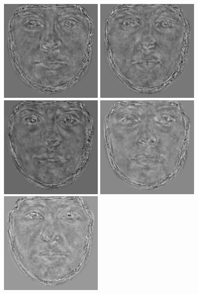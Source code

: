 \documentclass[12pt]{article}
\begin{document}
\begin{center}
    \includegraphics[width=5cm]{output_part1/eigenface_4.png}
    \includegraphics[width=5cm]{output_part1/eigenface_5.png}
    \includegraphics[width=5cm]{output_part1/eigenface_6.png}
    \includegraphics[width=5cm]{output_part1/eigenface_7.png}
    \includegraphics[width=5cm]{output_part1/eigenface_8.png}

\end{center}
\end{document}
